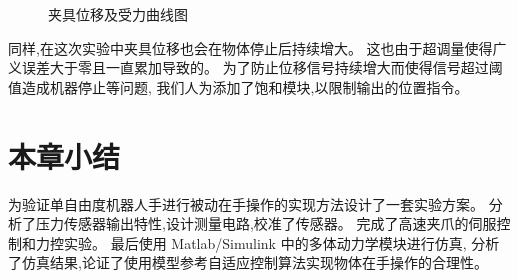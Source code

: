 \begin{figure}[!h]
  \centering
    \hspace{0pt}
  \caption{夹具位移及受力曲线图}
  \label{fig:4-11}
  \vspace{-0.3cm}
\end{figure}

同样,在这次实验中夹具位移也会在物体停止后持续增大。
这也由于超调量使得广义误差大于零且一直累加导致的。
为了防止位移信号持续增大而使得信号超过阈值造成机器停止等问题,
我们人为添加了饱和模块,以限制输出的位置指令。


\section{本章小结}
为验证单自由度机器人手进行被动在手操作的实现方法设计了一套实验方案。
分析了压力传感器输出特性,设计测量电路,校准了传感器。
完成了高速夹爪的伺服控制和力控实验。
最后使用 Matlab/Simulink 中的多体动力学模块进行仿真,
分析了仿真结果,论证了使用模型参考自适应控制算法实现物体在手操作的合理性。


